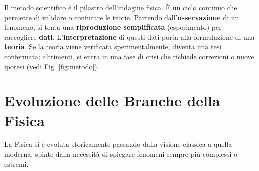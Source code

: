 Il metodo scientifico è il pilastro dell'indagine fisica. È un ciclo continuo che permette di validare o confutare le teorie.
Partendo dall'\textbf{osservazione} di un fenomeno, si tenta una \textbf{riproduzione semplificata} (esperimento) per raccogliere \textbf{dati}. L'\textbf{interpretazione} di questi dati porta alla formulazione di una \textbf{teoria}. Se la teoria viene verificata sperimentalmente, diventa una tesi confermata; altrimenti, si entra in una fase di crisi che richiede correzioni o nuove ipotesi (vedi Fig. \ref{fig:metodo}).



\section{Evoluzione delle Branche della Fisica}

La Fisica si è evoluta storicamente passando dalla visione classica a quella moderna, spinte dalla necessità di spiegare fenomeni sempre più complessi o estremi.

